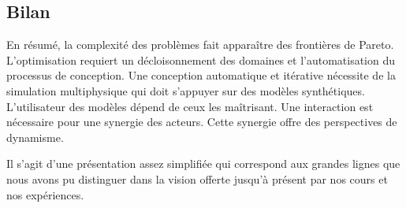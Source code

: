 \subsection{Bilan}

En résumé, la complexité des problèmes fait apparaître des frontières de Pareto.
L'optimisation requiert un décloisonnement des domaines et l'automatisation du
processus de conception. Une conception automatique et itérative nécessite de la
simulation multiphysique qui doit s'appuyer sur des modèles synthétiques.
L'utilisateur des modèles dépend de ceux les maîtrisant. Une interaction est
nécessaire pour une synergie des acteurs. Cette synergie offre des perspectives
de dynamisme.

Il s'agit d'une présentation assez simplifiée qui correspond aux grandes lignes
que nous avons pu distinguer dans la vision offerte jusqu'à présent par nos
cours et nos expériences.

